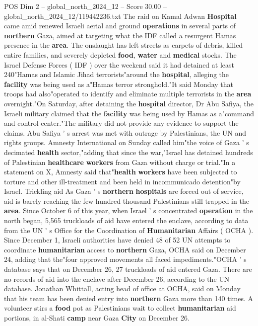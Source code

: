 \begin{textsample}{POS Dim 2 – global\_north\_2024\_12 – Score 30.00 – global\_north\_2024\_12/119442236.txt}
The raid on Kamal Adwan \textbf{Hospital} came amid renewed Israeli aerial and ground \textbf{operations} in several parts of \textbf{northern} Gaza, aimed at targeting what the IDF called a resurgent Hamas presence in the \textbf{area}.
The onslaught has left streets as carpets of debris, killed entire families, and severely depleted \textbf{food}, \textbf{water} and \textbf{medical} stocks.
The Israel Defense Forces ( IDF ) over the weekend said it had detained at least 240"Hamas and Islamic Jihad terrorists"around the \textbf{hospital}, alleging the \textbf{facility} was being used as a"Hamas terror stronghold."It said Monday that troops had also"operated to identify and eliminate multiple terrorists in the \textbf{area} overnight."On Saturday, after detaining the \textbf{hospital} director, Dr Abu Safiya, the Israeli military claimed that the \textbf{facility} was being used by Hamas as a"command and control center."The military did not provide any evidence to support the claims.
Abu Safiya ' s arrest was met with outrage by Palestinians, the UN and rights groups.
Amnesty International on Sunday called him"the voice of Gaza ' s decimated \textbf{health} sector,"adding that since the war,"Israel has detained hundreds of Palestinian \textbf{healthcare} \textbf{workers} from Gaza without charge or trial."In a statement on X, Amnesty said that"\textbf{health} \textbf{workers} have been subjected to torture and other ill-treatment and been held in incommunicado detention"by Israel.
Trickling aid As Gaza ' s \textbf{northern} \textbf{hospitals} are forced out of service, aid is barely reaching the few hundred thousand Palestinians still trapped in the \textbf{area}.
Since October 6 of this year, when Israel ' s concentrated \textbf{operation} in the north began, 5,565 truckloads of aid have entered the enclave, according to data from the UN ' s Office for the Coordination of \textbf{Humanitarian} Affairs ( OCHA ).
Since December 1, Israeli authorities have denied 48 of 52 UN attempts to coordinate \textbf{humanitarian} access to \textbf{northern} Gaza, OCHA said on December 24, adding that the"four approved movements all faced impediments."OCHA ' s database says that on December 26, 27 truckloads of aid entered Gaza.
There are no records of aid into the enclave after December 26, according to the UN database.
Jonathan Whittall, acting head of office at OCHA, said on Monday that his team has been denied entry into \textbf{northern} Gaza more than 140 times.
A volunteer stirs a \textbf{food} pot as Palestinians wait to collect \textbf{humanitarian} aid portions, in al-Shati \textbf{camp} near Gaza \textbf{City} on December 26.

\end{textsample}
